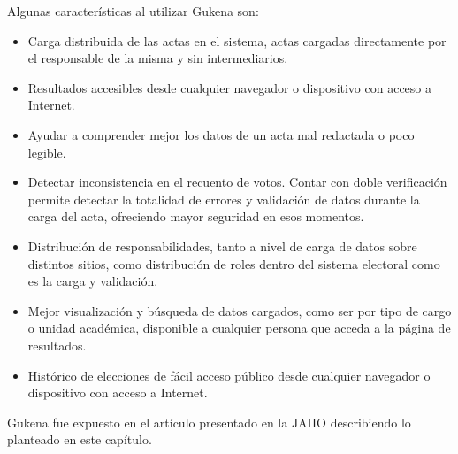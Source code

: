Algunas características al utilizar Gukena son:
\begin{itemize}
\item Carga distribuida de las actas en el sistema, actas cargadas directamente por el responsable de la misma y sin intermediarios.
\item Resultados accesibles desde cualquier navegador o dispositivo con acceso a Internet.
\item Ayudar a comprender mejor los datos de un acta mal redactada o poco legible.
\item Detectar inconsistencia en el recuento de votos. Contar con doble verificación permite detectar la totalidad de errores y validación de datos durante la carga del acta, ofreciendo mayor seguridad en esos momentos. 
\item Distribución de responsabilidades, tanto a nivel de carga de datos sobre distintos sitios, como distribución de roles dentro del sistema electoral como es la carga y validación.
\item Mejor visualización y búsqueda de datos cargados, como ser por tipo de cargo o unidad académica, disponible a cualquier persona que acceda a la página de resultados.
\item Histórico de elecciones de fácil acceso público desde cualquier navegador o dispositivo con acceso a Internet.
\end{itemize}

Gukena fue expuesto en el artículo presentado en la JAIIO describiendo lo planteado en este capítulo\cite{articuloGukena}.
